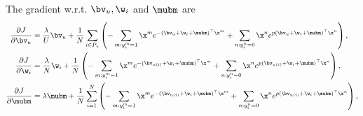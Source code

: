 The gradient w.r.t. $\bv_u, \w_i$ and $\mubm$ are
\begin{equation*}
\begin{aligned}
\frac{\partial J}{\partial \bv_u}
&= \frac{\lambda}{U} \bv_u + \frac{1}{N} \sum_{i \in P_u} \left( 
   - \sum_{m: y_i^m = 1} \x^m e^{-(\bv_{u} + \w_i + \mubm)^\top \x^m} 
   + \sum_{n: y_i^n = 0} \x^n e^{p (\bv_{u} + \w_i + \mubm)^\top \x^n} \right), \\
\frac{\partial J}{\partial \w_i}
&= \frac{\lambda}{N} \w_i + \frac{1}{N} \left( 
   - \sum_{m: y_i^m = 1} \x^m e^{-(\bv_{u(i)} + \w_i + \mubm)^\top \x^m} 
   + \sum_{n: y_i^n = 0} \x^n e^{p (\bv_{u(i)} + \w_i + \mubm)^\top \x^n} \right), \\
\frac{\partial J}{\partial \mubm}
&= \lambda \mubm + \frac{1}{N} \sum_{i=1}^N \left( 
   - \sum_{m: y_i^m = 1} \x^m e^{-(\bv_{u(i)} + \w_i + \mubm)^\top \x^m} 
   + \sum_{n: y_i^n = 0} \x^n e^{p (\bv_{u(i)} + \w_i + \mubm)^\top \x^n} \right), \\
\end{aligned}
\end{equation*}
